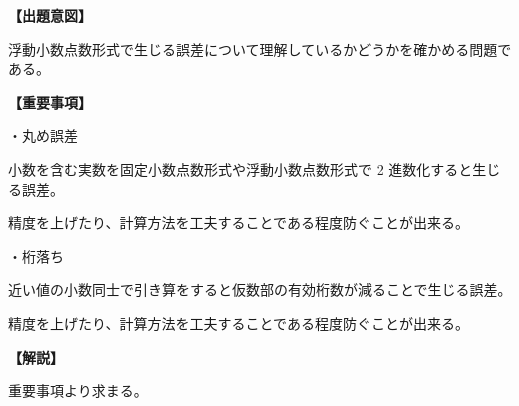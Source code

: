 \noindent \textbf{【出題意図】}

\noindent 浮動小数点数形式で生じる誤差について理解しているかどうかを確かめる問題である。

\vspace{1em}
\noindent \textbf{【重要事項】}

\medskip
\noindent ・丸め誤差

\medskip
\noindent 小数を含む実数を固定小数点数形式や浮動小数点数形式で 2 進数化すると生じる誤差。

\noindent 精度を上げたり、計算方法を工夫することである程度防ぐことが出来る。

\medskip
\noindent ・桁落ち

\medskip
\noindent 近い値の小数同士で引き算をすると仮数部の有効桁数が減ることで生じる誤差。

\noindent 精度を上げたり、計算方法を工夫することである程度防ぐことが出来る。


\vspace{1em}
\noindent \textbf{【解説】}

\noindent 重要事項より求まる。
